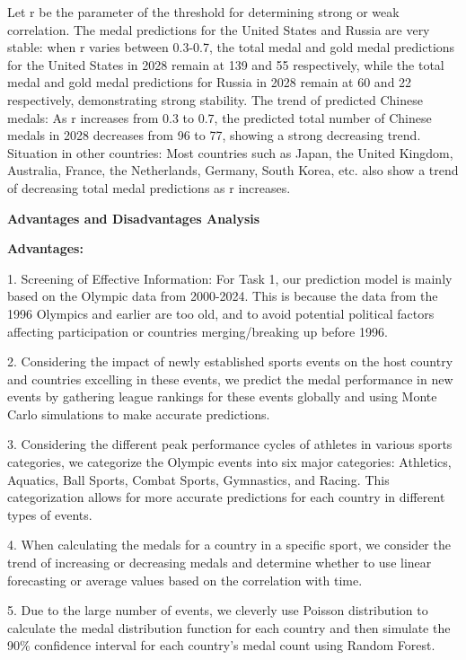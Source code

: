 \documentclass{mcmthesis}  %
\begin{document}
Let r be the parameter of the threshold for determining strong or weak correlation. 
The medal predictions for the United States and Russia are very stable: when r varies between 0.3-0.7, the total medal and gold medal predictions for the United States in 2028 remain at 139 and 55 respectively, while the total medal and gold medal predictions for Russia in 2028 remain at 60 and 22 respectively, demonstrating strong stability.
The trend of predicted Chinese medals: As r increases from 0.3 to 0.7, the predicted total number of Chinese medals in 2028 decreases from 96 to 77, showing a strong decreasing trend.
Situation in other countries: Most countries such as Japan, the United Kingdom, Australia, France, the Netherlands, Germany, South Korea, etc. also show a trend of decreasing total medal predictions as r increases.


\textbf{Advantages and Disadvantages Analysis}

\textbf{Advantages:}


1. Screening of Effective Information: For Task 1, our prediction model is mainly based on the Olympic data from 2000-2024. This is because the data from the 1996 Olympics and earlier are too old, and to avoid potential political factors affecting participation or countries merging/breaking up before 1996.

2. Considering the impact of newly established sports events on the host country and countries excelling in these events, we predict the medal performance in new events by gathering league rankings for these events globally and using Monte Carlo simulations to make accurate predictions.

3. Considering the different peak performance cycles of athletes in various sports categories, we categorize the Olympic events into six major categories: Athletics, Aquatics, Ball Sports, Combat Sports, Gymnastics, and Racing. This categorization allows for more accurate predictions for each country in different types of events.

4. When calculating the medals for a country in a specific sport, we consider the trend of increasing or decreasing medals and determine whether to use linear forecasting or average values based on the correlation with time.

5. Due to the large number of events, we cleverly use Poisson distribution to calculate the medal distribution function for each country and then simulate the 90\% confidence interval for each country's medal count using Random Forest.
\end{document}
